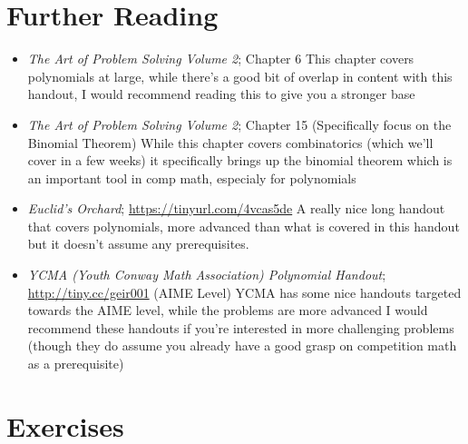 \documentclass[11pt]{article}
\begin{document}
\section{Further Reading}
\begin{itemize}
    \item \textit{The Art of Problem Solving Volume 2}; Chapter 6
    \newline \indent This chapter covers polynomials at large, while there's a good bit of overlap in content with this handout, I would recommend reading this to give you a stronger base
    \item \textit{The Art of Problem Solving Volume 2}; Chapter 15 (Specifically focus on the Binomial Theorem)
    \newline \indent While this chapter covers combinatorics (which we'll cover in a few weeks) it specifically brings up the binomial theorem which is an important tool in comp math, especialy for polynomials
    \item \textit{Euclid's Orchard}; \url{https://tinyurl.com/4vcas5de} 
    \newline \indent A really nice long handout that covers polynomials, more advanced than what is covered in this handout but it doesn't assume any prerequisites.
    \item \textit{YCMA (Youth Conway Math Association) Polynomial Handout}; \url{http://tiny.cc/geir001} (AIME Level)
    \newline \indent YCMA has some nice handouts targeted towards the AIME level, while the problems are more advanced I would recommend these handouts if you're interested in more challenging problems (though they do assume you already have a good grasp on competition math as a prerequisite)
\end{itemize}
\section{Exercises}
\end{document}
